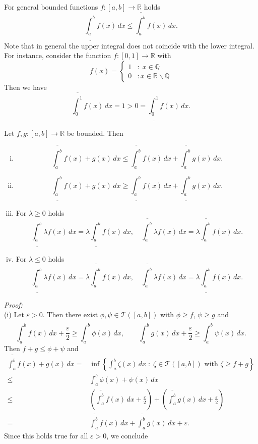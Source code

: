 For general bounded functions $f:[a,b]\to\mathbb{R}$ holds
\[\underline{\int_a^b}f(x)\, dx\leq \overline{\int_a^b}f(x)\, dx.\]
Note that in general the upper integral does not coincide with the lower integral. For instance, consider the function $f: [0,1] \to\mathbb{R}$
with
\[f(x)=\begin{cases}1&:\;x\in\mathbb{Q}\\0&:x\in\mathbb{R}\backslash\mathbb{Q}\end{cases}\]
Then we have
\[\overline{\int_0^1}f(x)\, dx=1>0=\underline{\int_0^1}f(x)\, dx.\]
\begin{Theorem}{}
Let $f,g:[a,b]\to\mathbb{R}$ be bounded. Then
\begin{enumerate}[(i)]
\item
\[\overline{\int_a^b}f(x)+g(x)\, dx\leq \overline{\int_a^b}f(x)\, dx+\overline{\int_a^b}g(x)\, dx.\]
\item
\[\underline{\int_a^b}f(x)+g(x)\, dx\geq \underline{\int_a^b}f(x)\, dx+\underline{\int_a^b}g(x)\, dx.\]
\item For $\lambda\geq0$ holds
\[\underline{\int_a^b}\lambda f(x)\, dx=\lambda \underline{\int_a^b}f(x)\, dx,\quad\overline{\int_a^b}\lambda f(x)\, dx=\lambda \overline{\int_a^b}f(x)\, dx.\]
\item For $\lambda\leq0$ holds
\[\underline{\int_a^b}\lambda f(x)\, dx=\lambda \overline{\int_a^b}f(x)\, dx,\quad\overline{\int_a^b}\lambda f(x)\, dx=\lambda \underline{\int_a^b}f(x)\, dx.\]
\end{enumerate}
\end{Theorem}
{\em Proof:}\\
(i) Let $\varepsilon>0$. Then there exist $\phi,\psi\in\mathcal{T}([a,b])$ with $\phi\geq f$, $\psi\geq g$ and
\[
\overline{\int_a^b}f(x)\, dx+\frac\varepsilon2\geq{\int_a^b}\phi(x)\, dx,\qquad
\overline{\int_a^b}g(x)\, dx+\frac\varepsilon2\geq{\int_a^b}\psi(x)\, dx.
\]
Then $f+g\leq\phi+\psi$ and
\[
\begin{aligned}
\overline{\int_a^b}f(x)+g(x)\, dx=&\inf\left\{\int_a^b\zeta(x)\, dx\;:\; \zeta\in\mathcal{T}([a,b])\text{ with }\zeta\geq f+g\right\}\\
\leq& {\int_a^b}\phi(x)+\psi(x)\, dx\\ \leq&
\left(\overline{\int_a^b}f(x)\, dx+\frac\varepsilon2\right)+\left(\overline{\int_a^b}g(x)\, dx+\frac\varepsilon2\right)\\=&
\overline{\int_a^b}f(x)\, dx+\overline{\int_a^b}g(x)\, dx+\varepsilon.
\end{aligned}
\]
Since this holds true for all $\varepsilon>0$, we conclude
